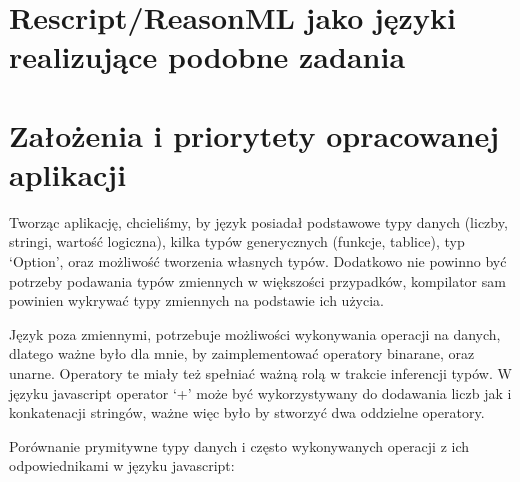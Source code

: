 \documentclass{article}
\begin{document}
\section{Rescript/ReasonML jako języki realizujące podobne zadania}

\section{Założenia i priorytety opracowanej aplikacji}
Tworząc aplikację, chcieliśmy, by język posiadał podstawowe typy danych (liczby, stringi, wartość logiczna), kilka typów generycznych (funkcje, tablice), typ `Option', oraz możliwość tworzenia własnych typów.
Dodatkowo nie powinno być potrzeby podawania typów zmiennych w większości przypadków, kompilator sam powinien wykrywać typy zmiennych na podstawie ich użycia.


Język poza zmiennymi, potrzebuje możliwości wykonywania operacji na danych, dlatego ważne było dla mnie, by zaimplementować operatory binarane, oraz unarne. Operatory te miały też spełniać ważną rolą w trakcie inferencji typów. W języku javascript operator `+' może być wykorzystywany do dodawania liczb jak i konkatenacji stringów, ważne więc było by stworzyć dwa oddzielne operatory.



Porównanie prymitywne typy danych i często wykonywanych operacji z ich odpowiednikami w języku javascript:
\end{document}
